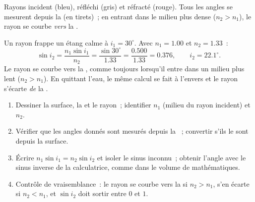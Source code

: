 \begin{omfigure}

{\small Rayons incident (bleu), réfléchi (gris) et réfracté (rouge).
Tous les angles se mesurent depuis la  (en tirets)~; en
entrant dans le milieu plus dense ($n_2 > n_1$), le rayon se courbe
\emph{vers} la .}
\end{omfigure}

\begin{example}\label{ex:g10:refraction:airwater}
Un rayon frappe un étang calme à $i_1 = 30^\circ$. Avec $n_1 = 1.00$ et
$n_2 = 1.33$~:
\[
\sin i_2 = \frac{n_1 \sin i_1}{n_2} = \frac{\sin 30^\circ}{1.33}
= \frac{0.500}{1.33} = 0.376,
\qquad
i_2 = 22.1^\circ .
\]
Le rayon se courbe vers la , comme toujours lorsqu'il entre
dans un milieu plus lent ($n_2 > n_1$). En quittant l'eau, le même
calcul se fait à l'envers et le rayon s'écarte \emph{de} la
.
\end{example}

\begin{method}\label{met:g10:refraction:method}
\begin{enumerate}
  \item Dessiner la surface, la  et le rayon~; identifier
        $n_1$ (milieu du rayon incident) et $n_2$.
  \item Vérifier que les angles donnés sont mesurés depuis la
        ~; convertir s'ils le sont depuis la surface.
  \item Écrire $n_1 \sin i_1 = n_2 \sin i_2$ et isoler le sinus
        inconnu~; obtenir l'angle avec le sinus inverse de la
        calculatrice, comme dans le volume de mathématiques.
  \item Contrôle de vraisemblance~: le rayon se courbe vers la
         si $n_2 > n_1$, s'en écarte si $n_2 < n_1$, et
        $\sin i_2$ doit sortir entre $0$ et $1$.
\end{enumerate}
\end{method}

